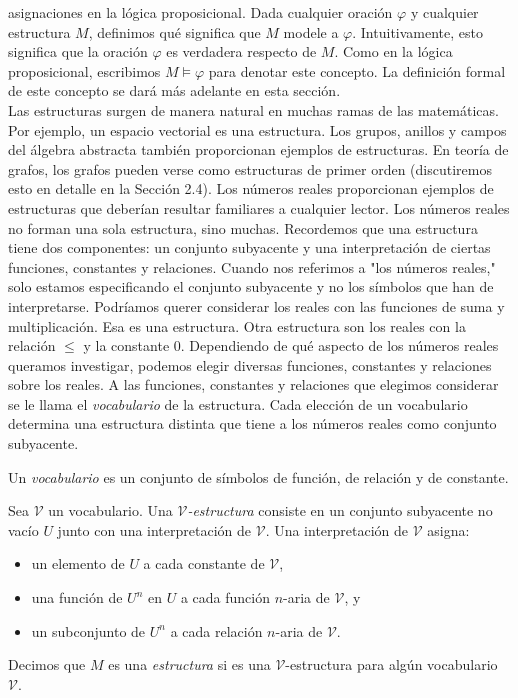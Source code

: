 \documentclass[12pt,a4paper]{book}
\newcommand{\comillas}[1]{"#1"}
\newcommand{\VV}{\mathcal{V}}
\begin{document}
    asignaciones en la lógica proposicional. Dada cualquier oración $\varphi$ y cualquier estructura $M$, definimos qué
    significa que $M$ modele a $\varphi$. Intuitivamente, esto significa que la oración $\varphi$ es verdadera respecto de
    $M$. Como en la lógica proposicional, escribimos $M\models\varphi$ para denotar este concepto. La definición formal de
    este concepto se dará más adelante en esta sección.\\
    Las estructuras surgen de manera natural en muchas ramas de las matemáticas. Por ejemplo, un espacio vectorial es una
    estructura. Los grupos, anillos y campos del álgebra abstracta también proporcionan ejemplos de estructuras. En teoría
    de grafos, los grafos pueden verse como estructuras de primer orden (discutiremos esto en detalle en la Sección 2.4). Los
    números reales proporcionan ejemplos de estructuras que deberían resultar familiares a cualquier lector. Los números
    reales no forman una sola estructura, sino muchas. Recordemos que una estructura tiene dos componentes: un conjunto
    subyacente y una interpretación de ciertas funciones, constantes y relaciones. Cuando nos referimos a \comillas{los
    números reales,} solo estamos especificando el conjunto subyacente y no los símbolos que han de interpretarse. Podríamos
    querer considerar los reales con las funciones de suma y multiplicación. Esa es una estructura. Otra estructura son los
    reales con la relación $\leq$ y la constante 0. Dependiendo de qué aspecto de los números reales queramos investigar,
    podemos elegir diversas funciones, constantes y relaciones sobre los reales. A las funciones, constantes y relaciones
    que elegimos considerar se le llama el \textit{vocabulario} de la estructura. Cada elección de un vocabulario determina
    una estructura distinta que tiene a los números reales como conjunto subyacente.

    \begin{definicion}[Vocabulario]\label{def:vocabulario}
        Un \textit{vocabulario} es un conjunto de símbolos de función, de relación y de constante.
    \end{definicion}

    \begin{definicion}[$\VV$-estructura]\label{def:v-estructura}
        Sea $\VV$ un vocabulario. Una \textit{$\VV$-estructura} consiste en un conjunto subyacente no vacío $U$ junto con
        una interpretación de $\VV$. Una interpretación de $\VV$ asigna:
        \begin{itemize}
            \item[$\bullet$] un elemento de $U$ a cada constante de $\VV$,
            \item[$\bullet$] una función de $U^{n}$ en $U$ a cada función $n$-aria de $\VV$, y
            \item[$\bullet$] un subconjunto de $U^{n}$ a cada relación $n$-aria de $\VV$.
        \end{itemize}
        Decimos que $M$ es una \textit{estructura} si es una $\VV$-estructura para algún vocabulario $\VV$.
    \end{definicion}
\end{document}
